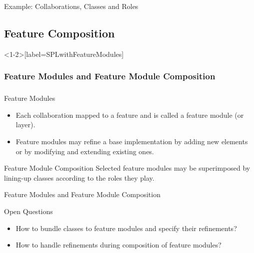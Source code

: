 \begin{frame}{Example: Collaborations, Classes and Roles}
	\begin{exampletight}{}
		\centering
	\end{exampletight}
\end{frame}

\subsection{Feature Composition}

\begin{frame}<1-2>[label=SPLwithFeatureModules]
	\frametitle<1-2>{Feature Modules and Feature Module Composition}
	\frametitle<3>{\myframetitle}
	\begin{mycolumns}[widths={65,35}]
		\begin{definition}{Feature Modules}
			\begin{itemize}
				\item Each collaboration mapped to a feature and is called a feature module (or layer).
				\item Feature modules may refine a base implementation by adding new elements or by modifying and extending existing ones.
			\end{itemize}
		\end{definition}
	\mynextcolumn
		\begin{definition}{Feature Module Composition}
			Selected feature modules may be superimposed by lining-up classes according to the roles they play.
		\end{definition}
	\end{mycolumns}
	\begin{exampletight}{}
		\centering
	\end{exampletight}
\end{frame}

\begin{frame}{Feature Modules and Feature Module Composition}
	\begin{note}{Open Questions}
		\begin{itemize}
			\item How to bundle classes to feature modules and specify their refinements?
			\item How to handle refinements during composition of feature modules?
		\end{itemize}
	\end{note}
	\begin{exampletight}{}
		\centering
	\end{exampletight}
\end{frame}

